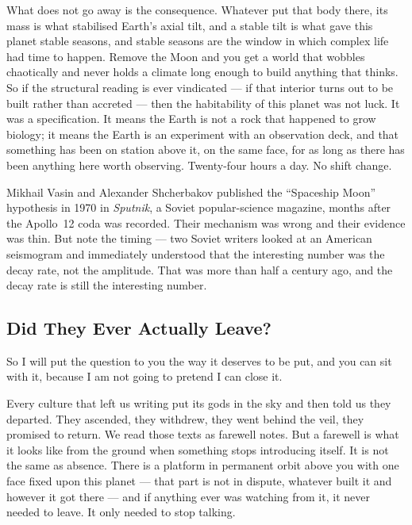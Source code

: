 What does not go away is the consequence. Whatever put that body there, its mass is what stabilised
Earth's axial tilt, and a stable tilt is what gave this planet stable seasons, and stable seasons are
the window in which complex life had time to happen. Remove the Moon and you get a world that wobbles
chaotically and never holds a climate long enough to build anything that thinks. So if the structural
reading is ever vindicated --- if that interior turns out to be built rather than accreted --- then
the habitability of this planet was not luck. It was a specification. It means the Earth is not a
rock that happened to grow biology; it means the Earth is an experiment with an observation deck, and
that something has been on station above it, on the same face, for as long as there has been anything
here worth observing. Twenty-four hours a day. No shift change. 

\begin{funfact}
Mikhail Vasin and Alexander Shcherbakov published the ``Spaceship Moon'' hypothesis in 1970 in
\emph{Sputnik}, a Soviet popular-science magazine, months after the Apollo~12 coda was recorded.
Their mechanism was wrong and their evidence was thin. But note the timing --- two Soviet writers
looked at an American seismogram and immediately understood that the interesting number was the
decay rate, not the amplitude. That was more than half a century ago, and the decay rate is still
the interesting number.
\end{funfact}

\subsection{Did They Ever Actually Leave?}\label{sec:didtheyleave}

So I will put the question to you the way it deserves to be put, and you can sit with it, because I
am not going to pretend I can close it.

Every culture that left us writing put its gods in the sky and then told us they departed. They
ascended, they withdrew, they went behind the veil, they promised to return. We read those texts as
farewell notes. But a farewell is what it looks like from the ground when something stops introducing
itself. It is not the same as absence. There is a platform in permanent orbit above you with one face
fixed upon this planet --- that part is not in dispute, whatever built it and however it got there ---
and if anything ever was watching from it, it never needed to leave. It only needed to stop talking.

